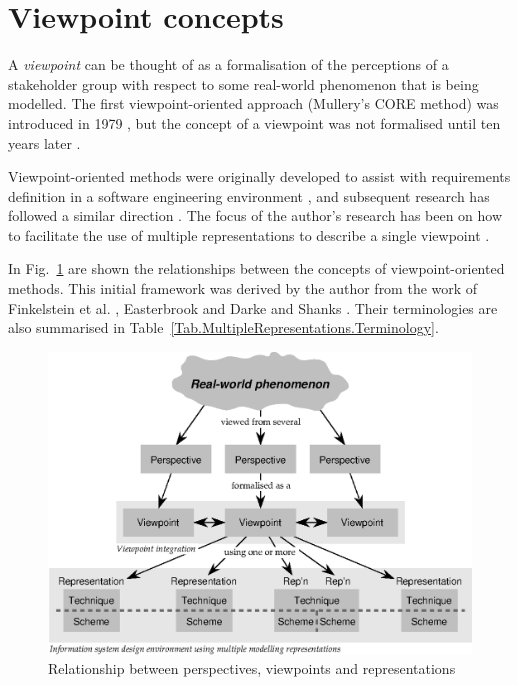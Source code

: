\documentclass[11pt,oribibl]{llncs}
\begin{document}

\section{Viewpoint concepts}
\label{Sec:Viewpoints}

A \emph{viewpoint} can be thought of as a formalisation of the perceptions of a stakeholder group with respect to some real-world phenomenon that is being modelled. The first viewpoint-oriented approach (Mullery's CORE method) was introduced in 1979 \cite{Mull:G:1979}, but the concept of a viewpoint was not formalised until ten years later \cite{Fink:ACW:1989}.

Viewpoint-oriented methods were originally developed to assist with requirements definition in a software engineering environment \cite{Mull:G:1979}, and subsequent research has followed a similar direction \cite{East:SM:1991:PhD,East:SM:1996,Koto:G:1996,Nuse:B:1994}. The focus of the author's research has been on how to facilitate the use of multiple representations to describe a single viewpoint \cite{Stan:N:1999:PhD,Stan:N:1997:ECIS97}.

In Fig.~\ref{Fig.Background.Terminology} are shown the relationships between the concepts of view\-point-oriented methods. This initial framework was derived by the author \cite{Stan:N:1997:ECIS97} from the work of Finkelstein et al. \cite{Fink:ACW:1989}, Easterbrook \cite{East:SM:1991:PhD} and Darke and Shanks \cite{Dark:P:1995}. Their terminologies are also summarised in Table~\ref{Tab.MultipleRepresentations.Terminology}.


\begin{figure}[htb]
	\centering
	\includegraphics[width=0.95\columnwidth,keepaspectratio]{Terminology}
	\caption{Relationship between perspectives, viewpoints and representations}
	\label{Fig.Background.Terminology}
\end{figure}
\end{document}
